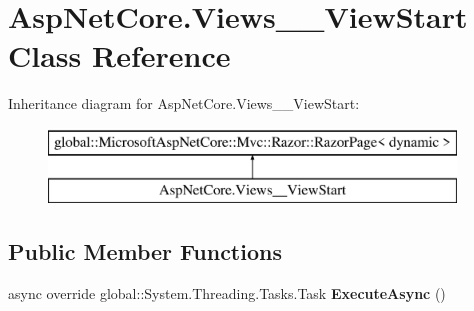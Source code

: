 \hypertarget{class_asp_net_core_1_1_views_____view_start}{}\section{Asp\+Net\+Core.\+Views\+\_\+\+\_\+\+View\+Start Class Reference}
\label{class_asp_net_core_1_1_views_____view_start}
Inheritance diagram for Asp\+Net\+Core.\+Views\+\_\+\+\_\+\+View\+Start\+:\begin{figure}[H]
\begin{center}
\leavevmode
\includegraphics[height=2.000000cm]{class_asp_net_core_1_1_views_____view_start}
\end{center}
\end{figure}
\subsection*{Public Member Functions}
\begin{DoxyCompactItemize}
\item 
\mbox{\label{class_asp_net_core_1_1_views_____view_start_ab3395816bd37d1d7f8ed1bceafaab28f}} 
async override global\+::\+System.\+Threading.\+Tasks.\+Task {\bfseries Execute\+Async} ()
\end{DoxyCompactItemize}
